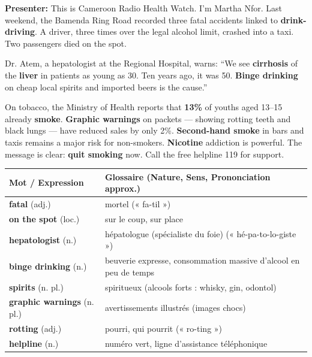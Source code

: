 \documentclass[11pt]{article}
\begin{document}
\begin{textebox}
\textbf{Presenter:} This is Cameroon Radio Health Watch. I’m Martha Nfor. Last weekend, the Bamenda Ring Road recorded three fatal accidents linked to \textbf{drink-driving}. A driver, three times over the legal alcohol limit, crashed into a taxi. Two passengers died on the spot.

Dr. Atem, a hepatologist at the Regional Hospital, warns: “We see \textbf{cirrhosis} of the \textbf{liver} in patients as young as 30. Ten years ago, it was 50. \textbf{Binge drinking} on cheap local spirits and imported beers is the cause.”

On tobacco, the Ministry of Health reports that \textbf{13\%} of youths aged 13–15 already \textbf{smoke}. \textbf{Graphic warnings} on packets — showing rotting teeth and black lungs — have reduced sales by only 2\%. \textbf{Second-hand smoke} in bars and taxis remains a major risk for non-smokers. \textbf{Nicotine} addiction is powerful. The message is clear: \textbf{quit smoking} now. Call the free helpline 119 for support.
\end{textebox}

\begin{center}
\begin{tabularx}{\linewidth}{|l|X|}
\hline
\rowcolor{popblueL} \textbf{Mot / Expression} & \textbf{Glossaire (Nature, Sens, Prononciation approx.)} \\
\hline
\textbf{fatal} (adj.) & mortel (« fa-til ») \\
\textbf{on the spot} (loc.) & sur le coup, sur place \\
\textbf{hepatologist} (n.) & hépatologue (spécialiste du foie) (« hé-pa-to-lo-giste ») \\
\textbf{binge drinking} (n.) & beuverie expresse, consommation massive d'alcool en peu de temps \\
\textbf{spirits} (n. pl.) & spiritueux (alcools forts : whisky, gin, odontol) \\
\textbf{graphic warnings} (n. pl.) & avertissements illustrés (images chocs) \\
\textbf{rotting} (adj.) & pourri, qui pourrit (« ro-ting ») \\
\textbf{helpline} (n.) & numéro vert, ligne d'assistance téléphonique \\
\hline
\end{tabularx}
\end{center}
\end{document}
